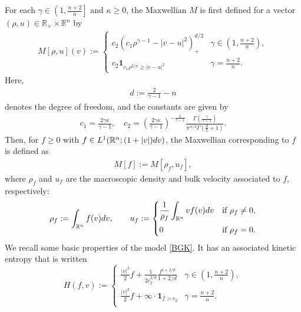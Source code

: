 \documentclass{amsart}
\theoremstyle{plain}
\theoremstyle{remark}
\numberwithin{equation}{section}
\newcommand{\R}{\mathbb{R}}
\newcommand{\dv}{\textnormal{d}v}
\begin{document}
For each $\gamma\in\left(1,\frac{n+2}{n}\right]$ and $\kappa\ge 0$, %
the Maxwellian $M$ is first defined for a vector $(\rho,u)\in \R_+\times \R^n$ by
\begin{align}
\label{def : M}
  M[\rho,u](v) := \begin{cases}
        \displaystyle c_2\left(c_1\rho^{\gamma-1} - |v-u|^2\right)_+^{d/2} &  \displaystyle \gamma \in \left(1,\frac{n+2}{n}\right), \\[9pt]
        \displaystyle c_2 \mathbf{1}_{c_1\rho^{2/n} \ge|v-u|^2} &  \displaystyle\gamma =\frac{n+2}{n}.
    \end{cases}  
\end{align}
Here,
\begin{align*}
    d := \frac{2}{\gamma-1}-n
\end{align*}
denotes the degree of freedom, and the constants are given by
\begin{align*}
    c_1 = \frac{2\gamma\kappa}{\gamma-1},\quad  c_2 = \left(\frac{2\gamma\kappa}{\gamma-1}\right)^{-\frac{1}{\gamma-1}} \frac{\Gamma\left(\frac{\gamma}{\gamma-1}\right)}{\pi^{n/2}\Gamma\left(\frac{d}{2}+1\right)}.
\end{align*}
Then, for $f\ge0$ with $f\in L^1(\R^n;(1+|v|)\dv)$, the Maxwellian corresponding to $f$ is defined as
\begin{align*}
    M[f] := M[\rho_f,u_f],
\end{align*}
where $\rho_f$ and $u_f$ are the macroscopic density and bulk velocity associated to $f$, respectively:
\begin{align*}
    \rho_{f} := \int_{\R^n} f(v) \dv, \qquad 
    u_{f} := \begin{cases} 
    \displaystyle\frac{1}{\rho_f}\int_{\R^n} v f(v) \dv &\text{if } \rho_f \ne 0, \\[9pt]
    0 &\text{if }\rho_f = 0.
    \end{cases}
\end{align*}
We recall some basic properties of the model \eqref{BGK}. It has an associated kinetic entropy that is written
\begin{equation}\label{eq:kin:ent}
    H(f,v) := \begin{cases}
      \displaystyle\frac{|v|^2}{2}f + \frac{1}{2c_2^{2/d}} \frac{f^{1+2/d}}{1+2/d} & \displaystyle\gamma \in \left(1,\frac{n+2}{n}\right),\\[9pt]
    \displaystyle\frac{|v|^2}{2}f + \infty \cdot \mathbf{1}_{f>c_2} & \displaystyle\gamma =\frac{n+2}{n}.\\
    \end{cases}
\end{equation}
\end{document}
